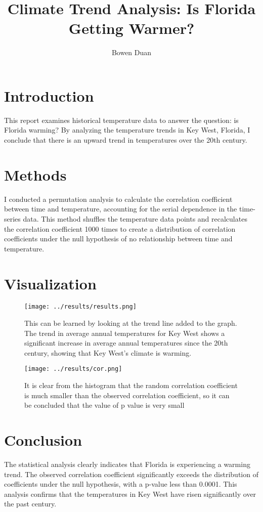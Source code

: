 \documentclass[10pt]{article}
\title{Climate Trend Analysis: Is Florida Getting Warmer?}
\author{Bowen Duan}
\begin{document}
\maketitle

\section{Introduction}
This report examines historical temperature data to answer the question: is Florida warming? By analyzing the temperature trends in Key West, Florida, I conclude that there is an upward trend in temperatures over the 20th century.

\section{Methods}
I conducted a permutation analysis to calculate the correlation coefficient between time and temperature, accounting for the serial dependence in the time-series data. This method shuffles the temperature data points and recalculates the correlation coefficient 1000 times to create a distribution of correlation coefficients under the null hypothesis of no relationship between time and temperature.

\section{Visualization}
\begin{figure}[ht]
\centering
\begin{minipage}{0.4\textwidth}
  \centering
  \texttt{[image: ../results/results.png]}
  \caption{This can be learned by looking at the trend line added to the graph. The trend in average annual temperatures for Key West shows a significant increase in average annual temperatures since the 20th century, showing that Key West's climate is warming.}
  \label{fig:temp_trend}
\end{minipage}
\hfill
\begin{minipage}{0.4\textwidth}
  \centering
  \texttt{[image: ../results/cor.png]}
  \caption{It is clear from the histogram that the random correlation coefficient is much smaller than the observed correlation coefficient, so it can be concluded that the value of p value is very small}
  \label{fig:corr_dist}
\end{minipage}
\end{figure}

\section{Conclusion}
The statistical analysis clearly indicates that Florida is experiencing a warming trend. The observed correlation coefficient significantly exceeds the distribution of coefficients under the null hypothesis, with a p-value less than 0.0001. This analysis confirms that the temperatures in Key West have risen significantly over the past century.
\end{document}
